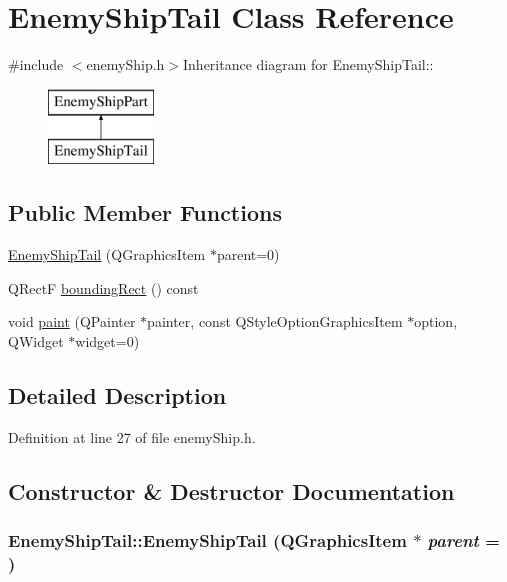 \hypertarget{class_enemy_ship_tail}{
\section{EnemyShipTail Class Reference}
\label{class_enemy_ship_tail}
}


{\ttfamily \#include $<$enemyShip.h$>$}Inheritance diagram for EnemyShipTail::\begin{figure}[H]
\begin{center}
\leavevmode
\includegraphics[height=2cm]{class_enemy_ship_tail}
\end{center}
\end{figure}
\subsection*{Public Member Functions}
\begin{DoxyCompactItemize}
\item 
\hyperlink{class_enemy_ship_tail_a1d17911e3e9243bda87bf5a3f5f473d9}{EnemyShipTail} (QGraphicsItem $\ast$parent=0)
\item 
QRectF \hyperlink{class_enemy_ship_tail_a59a7ac770b95a29daec1133450c523d6}{boundingRect} () const 
\item 
void \hyperlink{class_enemy_ship_tail_a6898d654a2e6b5f8e144ad5a006aa027}{paint} (QPainter $\ast$painter, const QStyleOptionGraphicsItem $\ast$option, QWidget $\ast$widget=0)
\end{DoxyCompactItemize}


\subsection{Detailed Description}


Definition at line 27 of file enemyShip.h.

\subsection{Constructor \& Destructor Documentation}
\hypertarget{class_enemy_ship_tail_a1d17911e3e9243bda87bf5a3f5f473d9}{
\subsubsection[{EnemyShipTail}]{\setlength{\rightskip}{0pt plus 5cm}EnemyShipTail::EnemyShipTail (QGraphicsItem $\ast$ {\em parent} = {})}}
\label{class_enemy_ship_tail_a1d17911e3e9243bda87bf5a3f5f473d9}


